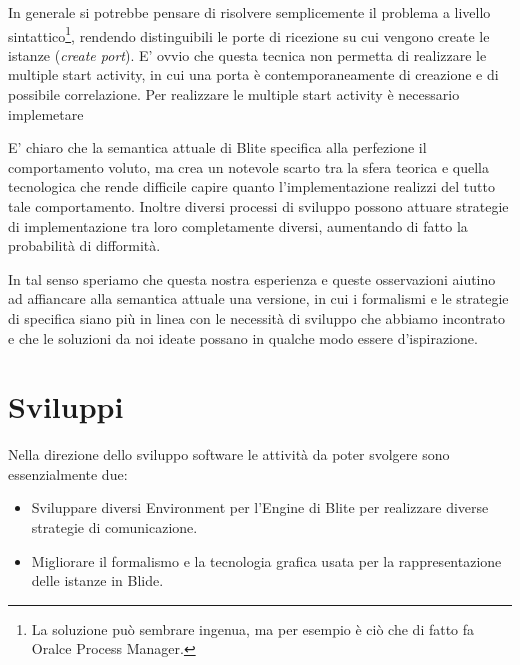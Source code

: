 In generale si potrebbe pensare di risolvere semplicemente il problema a livello
sintattico\footnote{La soluzione può sembrare ingenua, ma per esempio è ciò che
di fatto fa Oralce Process Manager.}, rendendo distinguibili le porte di
ricezione su cui vengono create le istanze (\emph{create port}). E' ovvio che
questa tecnica non permetta di realizzare le multiple start activity, in cui una
porta è contemporaneamente di creazione e di possibile correlazione. Per
realizzare le multiple start activity è necessario implemetare 


E' chiaro che la semantica attuale di Blite specifica alla perfezione il
comportamento voluto, ma crea un notevole scarto tra la sfera teorica e quella
tecnologica che rende difficile capire quanto l'implementazione realizzi del
tutto tale comportamento. Inoltre diversi processi di sviluppo possono attuare
strategie di implementazione tra loro completamente diversi, aumentando di fatto
la probabilità di difformità.

In tal senso speriamo che questa nostra esperienza e queste osservazioni
aiutino ad affiancare alla semantica attuale una versione, in cui i formalismi e
le strategie di specifica siano più in linea con le necessità di sviluppo che
abbiamo incontrato e che le soluzioni da noi ideate possano in qualche modo
essere d'ispirazione.
  
\section{Sviluppi}

Nella direzione dello sviluppo software le attività da poter svolgere sono
essenzialmente due:

\begin{itemize}
  \item Sviluppare diversi Environment per l'Engine di Blite per realizzare
  diverse strategie di comunicazione.
  \item Migliorare il formalismo e la tecnologia grafica usata per la
  rappresentazione delle istanze in Blide.
\end{itemize} 

